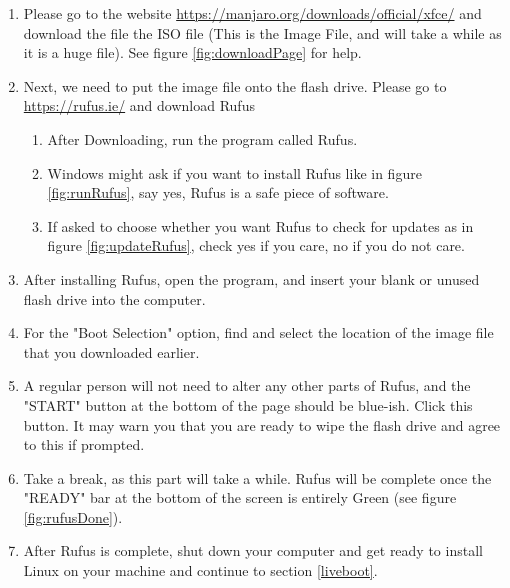 \documentclass{article}
\begin{document}
\begin{enumerate}
    \item Please go to the website \url{https://manjaro.org/downloads/official/xfce/} and download the file the ISO file (This is the Image File, and will take a while as it is a huge file). See figure \ref{fig:downloadPage} for help.
    \item Next, we need to put the image file onto the flash drive. Please go to \url{https://rufus.ie/} and download Rufus 
    \begin{enumerate}
        \item After Downloading, run the program called Rufus. 
        \item Windows might ask if you want to install Rufus like in figure \ref{fig:runRufus}, say yes, Rufus is a safe piece of software.
        \item If asked to choose whether you want Rufus to check for updates as in figure \ref{fig:updateRufus}, check yes if you care, no if you do not care. 
    \end{enumerate} 
    \item After installing Rufus, open the program, and insert your blank or unused flash drive into the computer. 
    \item For the "Boot Selection" option, find and select the location of the image file that you downloaded earlier.
    \item\label{rufusEnd} A regular person will not need to alter any other parts of Rufus, and the "START" button at the bottom of the page should be blue-ish. Click this button. It may warn you that you are ready to wipe the flash drive and agree to this if prompted.
    \item Take a break, as this part will take a while. Rufus will be complete once the "READY" bar at the bottom of the screen is entirely Green (see figure \ref{fig:rufusDone}).
    \item After Rufus is complete, shut down your computer and get ready to install Linux on your machine and continue to section \ref{liveboot}.
\end{enumerate}
\end{document}
